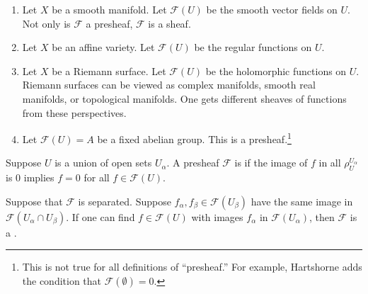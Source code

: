 \documentclass [11 pt, oneside, margin = 1 in] {article}
\begin{document}
\begin{example}[Presheaves]\label{}\text{}
\begin{enumerate}
	\item Let $X$ be a smooth manifold. Let $\mathscr{F}(U)$ be the smooth vector fields on $U$. Not only is $\mathscr{F}$ a presheaf, $\mathscr{F}$ is a sheaf.
	\item Let $X$ be an affine variety. Let $\mathscr{F}(U)$ be the regular functions on $U$.
	\item Let $X$ be a Riemann surface. Let $\mathscr{F}(U)$ be the holomorphic functions on $U$. Riemann surfaces can be viewed as complex manifolds, smooth real manifolds, or topological manifolds. One gets different sheaves of functions from these perspectives.
	\item Let $\mathscr{F}(U) = A$ be a fixed abelian group. This is a presheaf.\footnote{This is not true for all definitions of ``presheaf.'' For example, Hartshorne adds the condition that $\mathscr{F}(\emptyset) = 0$.}
\end{enumerate}
\end{example}


Suppose $U$ is a union of open sets $U_\alpha$. A presheaf $\mathscr{F}$ is  if the image of $f$ in all $\rho_{U}^{U_\alpha}$ is $0$ implies $f=0$ for all $f\in \mathscr{F}(U)$. 

Suppose that $\mathscr{F}$ is separated. Suppose $f_\alpha,f_\beta\in \mathscr{F}(U_\beta)$ have the same image in $\mathscr{F}(U_\alpha\cap U_\beta)$. If one can find $f\in \mathscr{F}(U)$ with images $f_\alpha$ in $\mathscr{F}(U_\alpha)$, then $\mathscr{F}$ is a .
\end{document}
